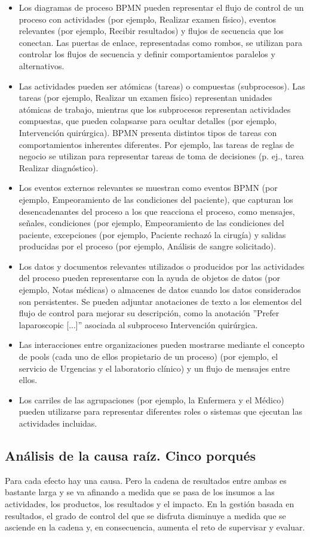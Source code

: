 \begin{itemize}
    \item Los diagramas de proceso BPMN pueden representar el flujo de control de un proceso con actividades (por ejemplo, Realizar examen físico), eventos relevantes (por ejemplo, Recibir resultados) y flujos de secuencia que los conectan. Las puertas de enlace, representadas como rombos, se utilizan para controlar los flujos de secuencia y definir comportamientos paralelos y alternativos.
    \item Las actividades pueden ser atómicas (tareas) o compuestas (subprocesos). Las tareas (por ejemplo, Realizar un examen físico) representan unidades atómicas de trabajo, mientras que los subprocesos representan actividades compuestas, que pueden colapsarse para ocultar detalles (por ejemplo, Intervención quirúrgica). BPMN presenta distintos tipos de tareas con comportamientos inherentes diferentes. Por ejemplo, las tareas de reglas de negocio se utilizan para representar tareas de toma de decisiones (p. ej., tarea Realizar diagnóstico).
    \item Los eventos externos relevantes se muestran como eventos BPMN (por ejemplo, Empeoramiento de las condiciones del paciente), que capturan los desencadenantes del proceso a los que reacciona el proceso, como mensajes, señales, condiciones (por ejemplo, Empeoramiento de las condiciones del paciente, excepciones (por ejemplo, Paciente rechazó la cirugía) y salidas producidas por el proceso (por ejemplo, Análisis de sangre solicitado).
    \item Los datos y documentos relevantes utilizados o producidos por las actividades del proceso pueden representarse con la ayuda de objetos de datos (por ejemplo, Notas médicas) o almacenes de datos cuando los datos considerados son persistentes. Se pueden adjuntar anotaciones de texto a los elementos del flujo de control para mejorar su descripción, como la anotación ''Prefer laparoscopic [...]'' asociada al subproceso Intervención quirúrgica.
    \item Las interacciones entre organizaciones pueden mostrarse mediante el concepto de pools (cada uno de ellos propietario de un proceso) (por ejemplo, el servicio de Urgencias y el laboratorio clínico) y un flujo de mensajes entre ellos.
    \item Los carriles de las agrupaciones (por ejemplo, la Enfermera y el Médico) pueden utilizarse para representar diferentes roles o sistemas que ejecutan las actividades incluidas.
\end{itemize}

\subsection{Análisis de la causa raíz. Cinco porqués}

Para cada efecto hay una causa.
Pero la cadena de resultados entre ambas es bastante larga y se va afinando a medida que se pasa de los insumos a las actividades, los productos, los resultados y el impacto.
En la gestión basada en resultados, el grado de control del que se disfruta disminuye a medida que se asciende en la cadena y, en consecuencia, aumenta el reto de supervisar y evaluar.